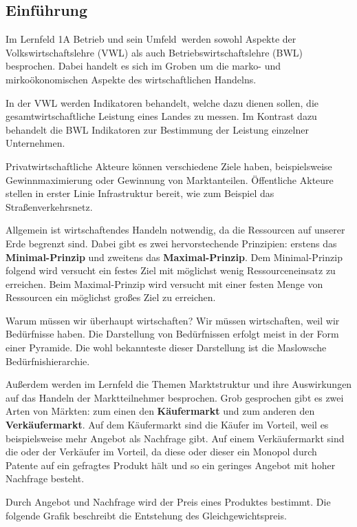 
\subsection{Einführung}
Im Lernfeld 1A \ql Betrieb und sein Umfeld\qr\ werden sowohl Aspekte der Volkswirtschaftslehre (VWL) als auch Betriebswirtschaftslehre (BWL) besprochen. Dabei handelt es sich im Groben um die marko- und mirkoökonomischen Aspekte des wirtschaftlichen Handelns.

In der VWL werden Indikatoren behandelt, welche dazu dienen sollen, die gesamtwirtschaftliche Leistung eines Landes zu messen. Im Kontrast dazu behandelt die BWL Indikatoren zur Bestimmung der Leistung einzelner Unternehmen.

Privatwirtschaftliche Akteure können verschiedene Ziele haben, beispielsweise Gewinnmaximierung oder Gewinnung von Marktanteilen. Öffentliche Akteure stellen in erster Linie Infrastruktur bereit, wie zum Beispiel das Straßenverkehrsnetz.

Allgemein ist wirtschaftendes Handeln notwendig, da die Ressourcen auf unserer Erde begrenzt sind. Dabei gibt es zwei hervorstechende Prinzipien: erstens das {\bf Minimal-Prinzip} und zweitens das {\bf Maximal-Prinzip}. Dem Minimal-Prinzip folgend wird versucht ein festes Ziel mit möglichst wenig Ressourceneinsatz zu erreichen. Beim Maximal-Prinzip wird versucht mit einer festen Menge von Ressourcen ein möglichst großes Ziel zu erreichen.

Warum müssen wir überhaupt wirtschaften? Wir müssen wirtschaften, weil wir Bedürfnisse haben. Die Darstellung von Bedürfnissen erfolgt meist in der Form einer Pyramide. Die wohl bekannteste dieser Darstellung ist die Maslowsche Bedürfnishierarchie.

Außerdem werden im Lernfeld die Themen Marktstruktur und ihre Auswirkungen auf das Handeln der Marktteilnehmer besprochen. Grob gesprochen gibt es zwei Arten von Märkten: zum einen den {\bf Käufermarkt} und zum anderen den {\bf Verkäufermarkt}. Auf dem Käufermarkt sind die Käufer im Vorteil, weil es beispielsweise mehr Angebot als Nachfrage gibt. Auf einem Verkäufermarkt sind die oder der Verkäufer im Vorteil, da diese oder dieser ein Monopol durch Patente auf ein gefragtes Produkt hält und so ein geringes Angebot mit hoher Nachfrage besteht.

Durch Angebot und Nachfrage wird der Preis eines Produktes bestimmt. Die folgende Grafik beschreibt die Entstehung des Gleichgewichtspreis.

